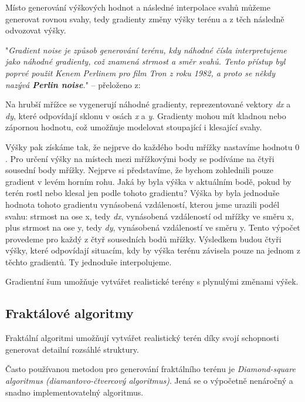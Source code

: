 Místo generování výškových hodnot a následné interpolace svahů můžeme generovat rovnou svahy, tedy gradienty změny výšky terénu a z těch následně odvozovat výšky. \cite{NoiseClanek}

"\textit{Gradient noise je způsob generování terénu, kdy náhodné čísla interpretujeme jako náhodné gradienty, což znamená strmost a směr svahů. Tento přístup byl poprvé použit Kenem Perlinem pro film Tron z roku 1982, a proto se někdy nazývá \textbf{Perlin noise}.}" -- přeloženo z: \cite{PCGinG}

Na hrubší mřížce se vygenerují náhodné gradienty, reprezentované vektory \textit{dx} a \textit{dy}, které odpovídají sklonu v osách \textit{x} a \textit{y}. Gradienty mohou mít kladnou nebo zápornou hodnotu, což umožňuje modelovat stoupající i klesající svahy. 


Výšky pak získáme tak, že nejprve do každého bodu mřížky nastavíme hodnotu $0$. Pro určení výšky na místech mezi mřížkovými body se podíváme na čtyři sousední body mřížky. Nejprve si představíme, že bychom zohlednili pouze gradient v levém horním rohu. Jaká by byla výška v aktuálním bodě, pokud by terén rostl nebo klesal jen podle tohoto gradientu? Výška by byla jednoduše hodnota tohoto gradientu vynásobená vzdáleností, kterou jsme urazili podél svahu: strmost na ose x, tedy \textit{dx}, vynásobená vzdáleností od mřížky ve směru x, plus strmost na ose y, tedy \textit{dy}, vynásobená vzdáleností ve směru y. Tento výpočet provedeme pro každý z čtyř sousedních bodů mřížky. Výsledkem budou čtyři výšky, které odpovídají situacím, kdy by výška terénu závisela pouze na jednom z těchto gradientů. Ty jednoduše interpolujeme. \cite{perlinClanek}

Gradientní šum umožňuje vytvářet realistické terény s plynulými změnami výšek.


\subsection{Fraktálové algoritmy}

Fraktální algoritmi umožňují vytvářet realistický terén díky svojí schopnosti generovat detailní rozsáhlé struktury. 

Často používanou metodou pro generování fraktálního terénu je \textit{Diamond-square algoritmus (diamantovo-čtvercový algoritmus)}. Jená se o výpočetně nenáročný a snadno implementovatelný algoritmus. \cite{fracMath}

